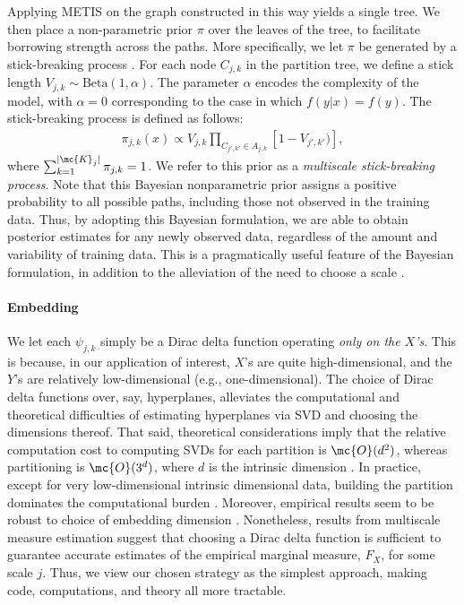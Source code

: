 	Applying METIS on the graph constructed in this way yields a single tree.  We then place a non-parametric prior $\pi$ over the leaves of the tree, to facilitate borrowing strength across the paths.  More specifically, we let $\pi$ be generated by a stick-breaking process \cite{stickbreaking}.  For each node $C_{j,k}$ in the partition tree, we define a stick length $V_{j,k} \sim \mbox{Beta}(1,\alpha)$.  The parameter $\alpha$ encodes the complexity of the model, with $\alpha=0$ corresponding to the case in which $f(y|x) = f(y)$. The stick-breaking process is defined as follows: 
	\begin{eqnarray*}
	\pi_{j,k}(x) \propto V_{j,k} \prod_{C_{j',k'} \in A_{j,k}} \left[1 - V_{j',k'}) \right],
	\end{eqnarray*}
	where  $\sum_{k=1}^{|\mc{K}_j|} \pi_{j,k} = 1$.   We refer to this prior as a {\em multiscale stick-breaking process}. Note that this Bayesian nonparametric prior assigns a positive probability to all possible paths, including those not observed in the training data.  Thus, by adopting this Bayesian formulation, we are able to obtain posterior estimates for any newly observed data, regardless of the amount and variability of training data.  This is a pragmatically useful feature of the Bayesian formulation, in addition to the alleviation of the need to choose a scale \cite{ChenMaggioni12}.  %


\paragraph{Embedding} We let each $\psi_{j,k}$ simply be a Dirac delta function operating \emph{only on the $X$'s}.  This is because, in our application of interest, $X$'s are quite high-dimensional, and the $Y$'s are relatively low-dimensional (e.g., one-dimensional).  The choice of Dirac delta functions over, say, hyperplanes, alleviates the computational and theoretical difficulties of estimating hyperplanes via SVD and choosing the dimensions thereof. That said,  theoretical considerations imply that the relative computation cost to computing SVDs for each partition is $\mc{O}(d^2)$, whereas partitioning  is  
$\mc{O}(3^d)$, where $d$ is the intrinsic dimension \cite{Allard2012}. In practice, except for very low-dimensional intrinsic dimensional data, building the partition dominates the computational burden \cite{Allard2012}.  Moreover, empirical results seem to be robust to choice of embedding dimension \cite{Lawlor2012}. Nonetheless, results from multiscale measure estimation \cite{ChenMaggioni12} suggest that choosing a Dirac delta function is sufficient to guarantee accurate estimates of the empirical marginal measure, $F_X$, for some scale $j$.  Thus, we view our chosen strategy as the simplest approach, making code, computations, and theory all more tractable.  


